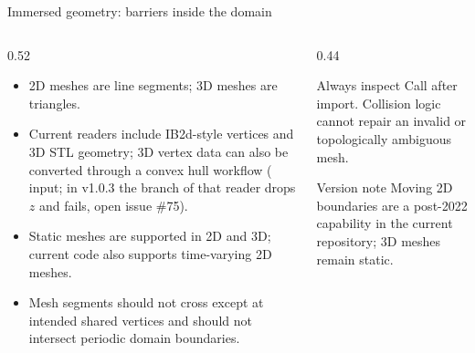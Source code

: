 \documentclass[aspectratio=169,11pt]{beamer}
\begin{document}
\begin{frame}{Immersed geometry: barriers inside the domain}
\label{fr:immersed}
\begin{columns}[T,onlytextwidth]
  \begin{column}{0.52\textwidth}
    \begin{itemize}
      \item 2D meshes are line segments; 3D meshes are triangles.
      \item Current readers include IB2d-style vertices and 3D STL geometry; 3D vertex data can also be converted through a convex hull workflow ( input; in v1.0.3 the  branch of that reader drops $z$ and fails, open issue \#75).
      \item Static meshes are supported in 2D and 3D; current code also supports time-varying 2D meshes.
      \item Mesh segments should not cross except at intended shared vertices and should not intersect periodic domain boundaries.
    \end{itemize}
  \end{column}
  \begin{column}{0.44\textwidth}
    \begin{block}{Always inspect}
      Call  after import. Collision logic cannot repair an invalid or topologically ambiguous mesh.
    \end{block}
    \begin{block}{Version note}
      Moving 2D boundaries are a post-2022 capability in the current repository; 3D meshes remain static.
    \end{block}
  \end{column}
\end{columns}
\end{frame}
\end{document}
